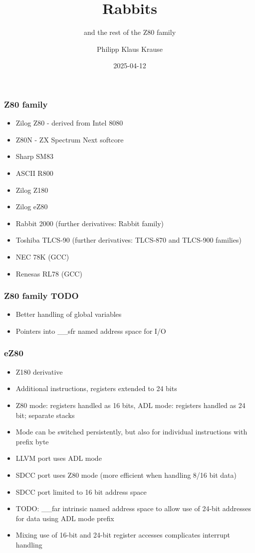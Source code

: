 \documentclass[xcolor=dvipsnames]{beamer}
\title{Rabbits}
\subtitle{and the rest of the Z80 family}
\date{2025-04-12}
\author{Philipp Klaus Krause}
\begin{document}
\begin{frame}
	\titlepage
\end{frame}

\begin{frame}
	\frametitle{Z80 family}
	\begin{itemize}
		\item Zilog Z80 - derived from Intel 8080
		\item Z80N - ZX Spectrum Next softcore
		\item Sharp SM83
		\item ASCII R800
		\item Zilog Z180
		\item Zilog eZ80
		\item Rabbit 2000 (further derivatives: Rabbit family)
		\item Toshiba TLCS-90 (further derivatives: TLCS-870 and TLCS-900 families)
		\item NEC 78K (GCC)
		\item Renesas RL78 (GCC)
	\end{itemize}
\end{frame}

\begin{frame}
	\frametitle{Z80 family TODO}
	\begin{itemize}
		\item Better handling of global variables
		\item Pointers into \_\_sfr named address space for I/O
	\end{itemize}
\end{frame}

\begin{frame}
	\frametitle{eZ80}
	\begin{itemize}
		\item Z180 derivative
		\item Additional instructions, registers extended to 24 bits
		\item Z80 mode: registers handled as 16 bits, ADL mode: registers handled as 24 bit; separate stacks
		\item Mode can be switched persistently, but also for individual instructions with prefix byte
		\item LLVM port uses ADL mode
		\item SDCC port uses Z80 mode (more efficient when handling 8/16 bit data)
		\item SDCC port limited to 16 bit address space
		\item TODO: \_\_far intrinsic named address space to allow use of 24-bit addresses for data using ADL mode prefix
		\item Mixing use of 16-bit and 24-bit register accesses complicates interrupt handling
	\end{itemize}
\end{frame}
\end{document}
